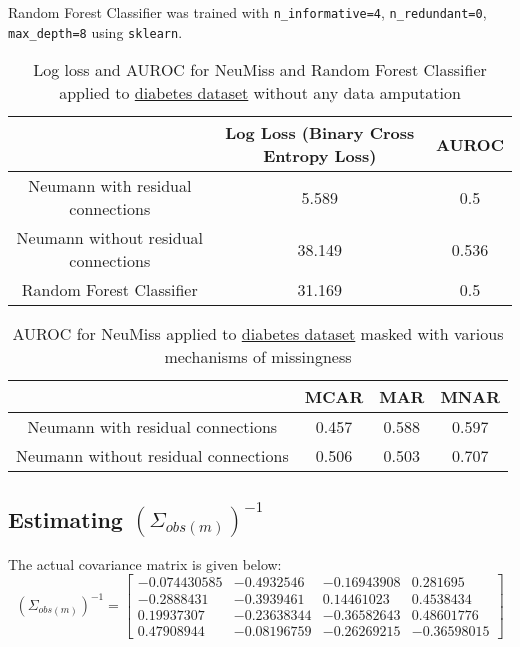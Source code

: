 \documentclass{article}
\begin{document}
Random Forest Classifier was trained with \verb|n_informative=4|, \verb|n_redundant=0|, \verb|max_depth=8| using \verb|sklearn|.

\begin{table}[h!]
\centering
\begin{tabular}{|c| c c|} 
 \hline
  & Log Loss (Binary Cross Entropy Loss) & AUROC \\ [0.5ex]
 \hline 
 Neumann with residual connections & 5.589 & 0.5 \\ 
 Neumann without residual connections & 38.149 & 0.536  \\
 Random Forest Classifier & 31.169 & 0.5 \\ [1ex] 
 \hline
\end{tabular}
\caption{Log loss and AUROC for NeuMiss and Random Forest Classifier applied to \href{https://www.kaggle.com/homayoonkhadivi/ai-for-medical-prognosis-diabetes-datasets?select=y_data.csv}{diabetes dataset} without any data amputation}
\label{table:2}
\end{table}


\begin{table}[h!]
\centering
\begin{tabular}{|c| c c c|} 
 \hline
  & MCAR & MAR & MNAR \\ [0.5ex]
 \hline 
 Neumann with residual connections & 0.457 & 0.588 & 0.597 \\ 
 Neumann without residual connections & 0.506 & 0.503 & 0.707 \\
 [1ex] 
 \hline
\end{tabular}
\caption{AUROC for NeuMiss applied to \href{https://www.kaggle.com/homayoonkhadivi/ai-for-medical-prognosis-diabetes-datasets?select=y_data.csv}{diabetes dataset} masked with various mechanisms of missingness}
\label{table:2}
\end{table}


\subsection{Estimating ${(\Sigma_{obs(m)})}^{-1}$}
The actual covariance matrix is given below:
\begin{equation}
{(\Sigma_{obs(m)})}^{-1} = 
\begin{bmatrix}
-0.074430585 & -0.4932546 & -0.16943908 & 0.281695 \\
-0.2888431 & -0.3939461 & 0.14461023 & 0.4538434 \\
0.19937307 & -0.23638344 & -0.36582643 & 0.48601776 \\
0.47908944 & -0.08196759 & -0.26269215 & -0.36598015
\end{bmatrix}
\end{equation}
\end{document}
